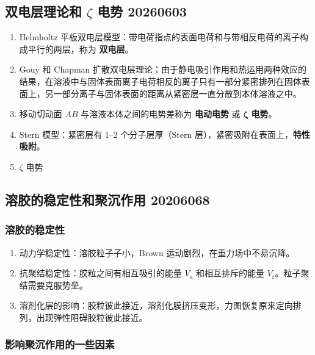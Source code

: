\subsection[双电层理论和 zeta 电势 20260603]{双电层理论和 $\zeta$ 电势 20260603}

\begin{enumerate}
    \item Helmholtz 平板双电层模型：带电荷指点的表面电荷和与带相反电荷的离子构成平行的两层，称为 \textbf{双电层}。
    \item Gouy 和 Chapman 扩散双电层理论：由于静电吸引作用和热运用两种效应的结果，在溶液中与固体表面离子电荷相反的离子只有一部分紧密排列在固体表面上，另一部分离子与固体表面的距离从紧密层一直分散到本体溶液之中。
    \item 移动切动面 $AB$ 与溶液本体之间的电势差称为 \textbf{电动电势} 或 $\boldsymbol{\zeta}$ \textbf{电势}。
    \item Stern 模型：紧密层有 \qtyrange{1}{2}{} 个分子层厚（Stern 层），紧密吸附在表面上，\textbf{特性吸附}。
    \item $\zeta$ 电势
\end{enumerate}

\subsection{溶胶的稳定性和聚沉作用 20206068}

\subsubsection{溶胶的稳定性}

\begin{enumerate}
    \item 动力学稳定性：溶胶粒子子小，Brown 运动剧烈，在重力场中不易沉降。
    \item 抗聚结稳定性：胶粒之间有相互吸引的能量 $V_\mathrm{a}$ 和相互排斥的能量 $V_\mathrm{r}$。粒子聚结需要克服势垒。
    \item 溶剂化层的影响：胶粒彼此接近，溶剂化膜挤压变形，力图恢复原来定向排列，出现弹性阻碍胶粒彼此接近。
\end{enumerate}

\subsubsection{影响聚沉作用的一些因素}

